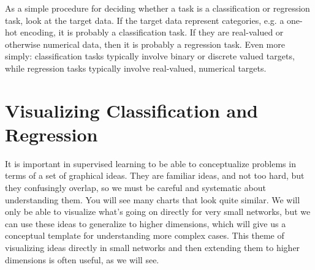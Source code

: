 As a simple procedure for deciding whether a task is a classification or regression task, look at the target data. If the target data represent categories, e.g. a one-hot encoding, it is probably a classification task. If they are real-valued or otherwise numerical data, then it is probably a regression task. Even more simply: classification tasks typically involve binary or discrete valued targets, while regression tasks typically  involve real-valued, numerical targets. 

\section{Visualizing Classification and Regression}\label{visualizeRegressionClassification}


It is important in supervised learning to be able to conceptualize problems in terms of a set of graphical ideas. They are familiar ideas, and not too hard, but they confusingly overlap, so we must be careful and systematic about understanding them. You will see many charts that look quite similar. We will only be able to visualize what's going on directly for very small networks, but we can use these ideas to generalize to higher dimensions, which will give us a conceptual template for understanding more complex cases. This theme of visualizing ideas directly in small networks and then extending them to higher dimensions is often useful, as we will see.

